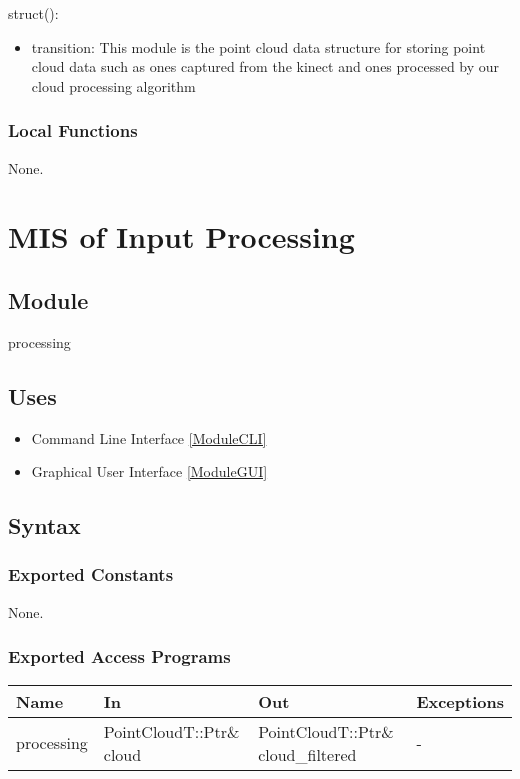 \documentclass[12pt, titlepage]{article}
\begin{document}
\noindent struct():
\begin{itemize}
\item transition: This module is the point cloud data structure for storing point cloud data such as ones captured from the kinect and ones processed by our cloud processing algorithm
\end{itemize}


\subsubsection{Local Functions}

None.

\newpage

\section{MIS of Input Processing} \label{ModuleIP} 


\subsection{Module}

processing

\subsection{Uses}

\begin{itemize}
\item Command Line Interface \ref{ModuleCLI}
\item Graphical User Interface \ref{ModuleGUI}
\end{itemize}

\subsection{Syntax}

\subsubsection{Exported Constants}

None.

\subsubsection{Exported Access Programs}

\begin{center}
\begin{tabular}{p{2cm} p{4cm} p{4cm} p{2cm}}
\hline
\textbf{Name} & \textbf{In} & \textbf{Out} & \textbf{Exceptions} \\
\hline
processing & PointCloudT::Ptr\& cloud & PointCloudT::Ptr\& cloud\_filtered & - \\
\hline
\end{tabular}
\end{center}
\end{document}
